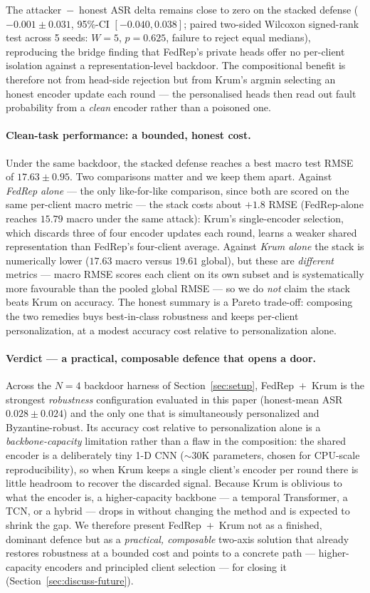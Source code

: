 \documentclass[a4paper,fleqn,doubleblind]{cas-sc}
\begin{document}
The attacker~$-$~honest ASR delta remains close to zero on the
stacked defense ($-0.001 \pm 0.031$, 95\%-CI $[-0.040, 0.038]$;
paired two-sided Wilcoxon signed-rank test across 5 seeds:
$W = 5$, $p = 0.625$, failure to reject equal medians), reproducing
the bridge finding that FedRep's private heads offer no per-client
isolation against a representation-level backdoor. The compositional
benefit is therefore not from head-side rejection but from Krum's
argmin selecting an honest encoder update each round --- the
personalised heads then read out fault probability from a
\emph{clean} encoder rather than a poisoned one.

\paragraph{Clean-task performance: a bounded, honest cost.}
Under the same backdoor, the stacked defense reaches a best macro
test RMSE of $17.63 \pm 0.95$. Two comparisons matter and we keep
them apart. Against \emph{FedRep alone} --- the only like-for-like
comparison, since both are scored on the same per-client macro
metric --- the stack costs about $+1.8$ RMSE (FedRep-alone reaches
$15.79$ macro under the same attack): Krum's single-encoder
selection, which discards three of four encoder updates each round,
learns a weaker shared representation than FedRep's four-client
average. Against \emph{Krum alone} the stack is numerically lower
($17.63$ macro versus $19.61$ global), but these are \emph{different}
metrics --- macro RMSE scores each client on its own subset and is
systematically more favourable than the pooled global RMSE --- so we
do \emph{not} claim the stack beats Krum on accuracy. The honest
summary is a Pareto trade-off: composing the two remedies buys
best-in-class robustness and keeps per-client personalization, at a
modest accuracy cost relative to personalization alone.

\paragraph{Verdict --- a practical, composable defence that opens a door.}
Across the $N = 4$ backdoor harness of Section~\ref{sec:setup},
FedRep~$+$~Krum is the strongest \emph{robustness} configuration
evaluated in this paper (honest-mean ASR $0.028 \pm 0.024$) and the
only one that is simultaneously personalized and Byzantine-robust.
Its accuracy cost relative to personalization alone is a
\emph{backbone-capacity} limitation rather than a flaw in the
composition: the shared encoder is a deliberately tiny 1-D CNN
($\sim 30$K parameters, chosen for CPU-scale reproducibility), so
when Krum keeps a single client's encoder per round there is little
headroom to recover the discarded signal. Because Krum is oblivious
to what the encoder is, a higher-capacity backbone --- a temporal
Transformer, a TCN, or a hybrid --- drops in without changing the
method and is expected to shrink the gap. We therefore present
FedRep~$+$~Krum not as a finished, dominant defence but as a
\emph{practical, composable} two-axis solution that already restores
robustness at a bounded cost and points to a concrete path ---
higher-capacity encoders and principled client selection --- for
closing it (Section~\ref{sec:discuss-future}).
\end{document}
